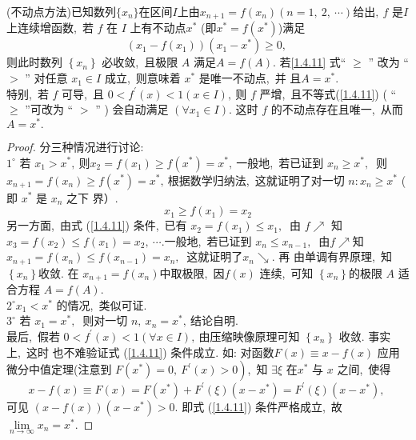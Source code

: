 \begin{problem}
	(不动点方法)已知数列$\{x_n\}$在区间$I$上由$x_{n+1}=f(x_n)(n=1,\ 2,\ \cdots)$给出$,\   f $ 是$  I  $上连续增函数,\  若  $f $ 在  $I$  上有不动点$  x^{*} $ (即$x^*=f(x^*)$)满足
	\begin{equation}
		\left(x_{1}-f\left(x_{1}\right)\right)\left(x_{1}-x^{*}\right) \geqslant 0,\ \label{1.4.11}
	\end{equation}
	则此时数列 $ \left\{x_{n}\right\}$  必收敛,\  且极限 $ A $ 满足$  A=f(A) .$
	若\eqref{1.4.11} 式“  $\geqslant$  ” 改为 “  $>$  ” 对任意 $ x_{1} \in I $ 成立,\  则意味着  $x^{*} $ 是唯一不动点,\  并 且$  A=x^{*} .$\\
	特别,\  若 $ f $ 可导,\  且  $0<f^{\prime}(x)<1(x \in I) ,\  $则 $ f $ 严增,\  且不等式(\eqref{1.4.11})  ( “  $\geqslant$  ”可改为 “ $ > $ ” ) 会自动满足  $\left(\forall x_{1} \in I\right) .$ 这时  $f $ 的不动点存在且唯一,\  从而$  A=x^{*} .$
\end{problem}
\begin{proof}
	分三种情况进行讨论:\\
	$1^{\circ} $ 若 $ x_{1}>x^{*} ,\  $则$  x_{2}=f\left(x_{1}\right) \geqslant f\left(x^{*}\right)=x^{*} ,\  $一般地,\  若已证到 $ x_{n} \geqslant x^{*} ,\ $ 则$  x_{n+1}=   f\left(x_{n}\right) \geqslant f\left(x^{*}\right)=x^{*} ,\  $根据数学归纳法,\  这就证明了对一切 $ n: x_{n} \geqslant x^{*} $ ( 即 $ x^{*} $ 是 $ x_{n}$  之下 界）.
	$$x_{1} \geqslant f\left(x_{1}\right)=x_{2}$$
	另一方面,\  由式  (\eqref{1.4.11})  条件,\  已有 $ x_{2}=f\left(x_{1}\right) \leqslant x_{1} ,\ $ 由 $ f \nearrow $ 知 $ x_{3}=f\left(x_{2}\right) \leqslant f\left(x_{1}\right)=x_{2},\  \cdots . $一般地,\  若已证到 $ x_{n} \leqslant x_{n-1} ,\ $ 由$  f \nearrow  $知 $ x_{n+1}=f\left(x_{n}\right) \leqslant f\left(x_{n-1}\right)=x_{n} ,\ $ 这就证明了$  x_{n} \searrow .$ 再 由单调有界原理,\  知  $\left\{x_{n}\right\}  $收敛.
	在  $x_{n+1}=f\left(x_{n}\right)  $中取极限,\  因$  f(x) $ 连续,\  可知  $\left\{x_{n}\right\}  $的极限 $ A $ 适合方程 $ A=f(A) . $\\
	$2^{\circ} x_{1}<x^{*} $ 的情况,\  类似可证.\\
	$3^{\circ} $ 若 $ x_{1}=x^{*} ,\ $ 则对一切 $ n,\  x_{n}=x^{*} ,\  $结论自明.\\
	最后,\  假若 $ 0<f^{\prime}(x)<1(\forall x \in I) ,\  $由压缩映像原理可知 $ \left\{x_{n}\right\} $ 收敛. 事实上,\  这时 也不难验证式  (\eqref{1.4.11})  条件成立. 如: 对函数$  F(x) \equiv x-f(x) $ 应用微分中值定理(注意到 $ \left.F\left(x^{*}\right)=0,\  F^{\prime}(x)>0\right) $,\  知 $ \exists \xi $ 在$  x^{*} $ 与 $ x $ 之间,\  使得
	$$x-f(x) \equiv F(x)=F\left(x^{*}\right)+F^{\prime}(\xi)\left(x-x^{*}\right)=F^{\prime}(\xi)\left(x-x^{*}\right) ,\ $$
	可见 $ (x-f(x))\left(x-x^{*}\right)>0 .$ 即式  (\eqref{1.4.11})  条件严格成立,\  故  $\lim\limits_{n \rightarrow \infty} x_{n}=x^{*} .$
\end{proof}
